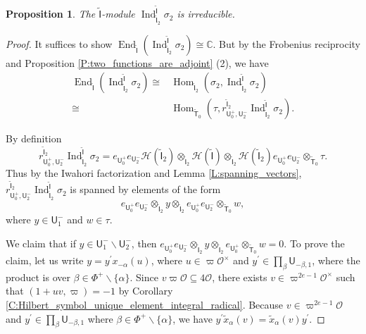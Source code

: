 \documentclass[10pt, letterpaper]{amsart}
\theoremstyle{plain}
\newtheorem{Prop}[equation]{Proposition}
\theoremstyle{definition}
\numberwithin{equation}{section}
\newcommand{\xt}{\tilde{x}}
\newcommand{\Ind}{\operatorname{Ind}}
\newcommand{\End}{\operatorname{End}}
\newcommand{\Hom}{\operatorname{Hom}}
\newcommand{\If}{\mathsf{I}}
\newcommand{\Tf}{\mathsf{T}}
\newcommand{\Uf}{\mathsf{U}}
\begin{document}
\begin{Prop}\label{Gamma02IrrInd}
	The $\widetilde{{\If}}$-module $\Ind_{\widetilde{{\If}}_{2}}^{\widetilde{{\If}}}\sigma_{2}$ is irreducible.
\end{Prop}

\begin{proof}
It suffices to show $\End_{\widetilde{{\If}}}(\Ind_{\widetilde{{\If}}_{2}}^{\widetilde{{\If}}}\sigma_{2})\cong \mathbb{C}$. But by the Frobenius reciprocity and Proposition \ref{P:two_functions_are_adjoint} (2), we have
	\begin{align*}
		\End_{\widetilde{{\If}}}(\Ind_{\widetilde{{\If}}_{2}}^{\widetilde{{\If}}}\sigma_{2})\cong& \Hom_{\widetilde{{\If}}_{2}}(\sigma_{2},\Ind_{\widetilde{{\If}}_{2}}^{\widetilde{{\If}}}\sigma_{2})\\
		\cong& \Hom_{\widetilde{{\Tf}}_{0}}(\tau, r_{{\Uf}^{+}_{0},{\Uf}^{-}_{2}}^{\widetilde{{\If}}_{2}}\Ind_{\widetilde{{\If}}_{2}}^{\widetilde{{\If}}}\sigma_{2}).
	\end{align*}
	
	By definition
	\begin{equation*}
		r_{{\Uf}^{+}_{0},{\Uf}^{-}_{2}}^{\widetilde{{\If}}_{2}}\Ind_{\widetilde{{\If}}_{2}}^{\widetilde{{\If}}}\sigma_{2}=e_{{\Uf}^{+}_{0}}e_{{\Uf}^{-}_{2}}\mathcal{H}(\widetilde{{\If}}_{2})\otimes_{\widetilde{{\If}}_{2}} \mathcal{H}(\widetilde{{\If}})\otimes_{\widetilde{{\If}}_{2}}\mathcal{H}(\widetilde{{\If}}_{2})e_{{\Uf}^{+}_{0}}e_{{\Uf}^{-}_{2}}\otimes_{\widetilde{{\Tf}}_{0}}\tau.
	\end{equation*}
Thus by the Iwahori factorization and Lemma \ref{L:spanning_vectors}, $r_{{\Uf}^{+}_{0},{\Uf}^{-}_{2}}^{\widetilde{{\If}}_{2}}\Ind_{\widetilde{{\If}}_{2}}^{\widetilde{{\If}}}\sigma_{2}$ is spanned by elements of the form 
\begin{equation*}
	e_{{\Uf}^{+}_{0}}e_{{\Uf}^{-}_{2}}\otimes_{\widetilde{{\If}}_{2}} y\otimes_{\widetilde{{\If}}_{2}}e_{{\Uf}^{+}_{0}}e_{{\Uf}^{-}_{2}}\otimes_{\widetilde{{\Tf}}_{0}} w,
\end{equation*}	
where $y\in {\Uf}^{-}_{1}$ and $w\in\tau$.

We claim that if $y\in {\Uf}^{-}_{1}\smallsetminus{\Uf}^{-}_{2}$, then $e_{{\Uf}^{+}_{0}}e_{{\Uf}^{-}_{2}}\otimes _{\widetilde{{\If}}_{2}}y\otimes_{\widetilde{{\If}}_{2}}e_{{\Uf}^{+}_{0}}\otimes_{\widetilde{{\Tf}}_{0}} w=0$. To prove the claim, let us write $y=y^{\prime}x_{-\alpha}(u)$, where $u\in\varpi\mathcal{O}^{\times}$ and $y^{\prime}\in \prod_{\beta}{\Uf}_{-\beta,1}$, where the product is over $\beta\in \Phi^{+}\smallsetminus\{\alpha\}$. Since $v\varpi\mathcal{O}\subseteq 4\mathcal{O}$, there exists $v\in \varpi^{2e-1}\mathcal{O}^{\times}$ such that $(1+ uv,\varpi)=-1$ by Corollary \ref{C:Hilbert_symbol_unique_element_integral_radical}. Because $v\in \varpi^{2e-1}\mathcal{O}$ and $y^{\prime}\in \prod_{\beta}{\Uf}_{-\beta,1}$ where $\beta\in \Phi^{+}\smallsetminus\{\alpha\}$, we have $y^{\prime}\xt_{\alpha}(v)=\xt_{\alpha}(v)y^{\prime}$.


\end{proof}
\end{document}
